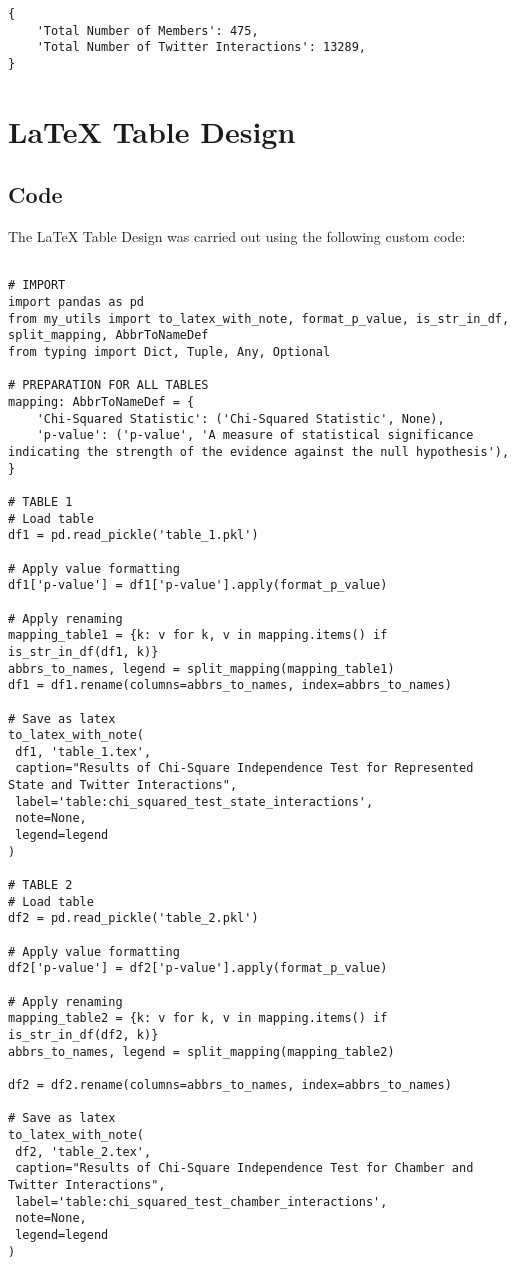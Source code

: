 \documentclass[11pt]{article}
\begin{document}
\begin{Verbatim}[tabsize=4]
{
    'Total Number of Members': 475,
    'Total Number of Twitter Interactions': 13289,
}
\end{Verbatim}

\section{LaTeX Table Design}
\subsection{{Code}}
The LaTeX Table Design was carried out using the following custom code:

\begin{verbatim}

# IMPORT
import pandas as pd
from my_utils import to_latex_with_note, format_p_value, is_str_in_df, split_mapping, AbbrToNameDef
from typing import Dict, Tuple, Any, Optional

# PREPARATION FOR ALL TABLES
mapping: AbbrToNameDef = {
    'Chi-Squared Statistic': ('Chi-Squared Statistic', None),
    'p-value': ('p-value', 'A measure of statistical significance indicating the strength of the evidence against the null hypothesis'),
}

# TABLE 1
# Load table
df1 = pd.read_pickle('table_1.pkl')

# Apply value formatting
df1['p-value'] = df1['p-value'].apply(format_p_value)

# Apply renaming
mapping_table1 = {k: v for k, v in mapping.items() if is_str_in_df(df1, k)} 
abbrs_to_names, legend = split_mapping(mapping_table1)
df1 = df1.rename(columns=abbrs_to_names, index=abbrs_to_names)

# Save as latex
to_latex_with_note(
 df1, 'table_1.tex',
 caption="Results of Chi-Square Independence Test for Represented State and Twitter Interactions", 
 label='table:chi_squared_test_state_interactions',
 note=None,
 legend=legend
)

# TABLE 2
# Load table
df2 = pd.read_pickle('table_2.pkl')

# Apply value formatting
df2['p-value'] = df2['p-value'].apply(format_p_value)

# Apply renaming
mapping_table2 = {k: v for k, v in mapping.items() if is_str_in_df(df2, k)}
abbrs_to_names, legend = split_mapping(mapping_table2)

df2 = df2.rename(columns=abbrs_to_names, index=abbrs_to_names)

# Save as latex
to_latex_with_note(
 df2, 'table_2.tex',
 caption="Results of Chi-Square Independence Test for Chamber and Twitter Interactions", 
 label='table:chi_squared_test_chamber_interactions',
 note=None,
 legend=legend
)

\end{verbatim}
\end{document}
